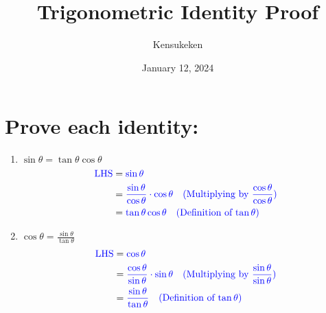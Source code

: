 \documentclass{article}
\title{Trigonometric Identity Proof}
\author{Kensukeken}
\date{January 12, 2024}
\begin{document}
\maketitle

\section{Prove each identity:}
\begin{multicols}{2}
    \begin{enumerate}[label=\alph*.]
        \item $\sin\theta = \tan \theta \cos \theta$
        \begin{align*}
          \text{\textcolor{blue}{LHS}} &= \text{\textcolor{blue}{$\sin\theta$}} \\
          &= \text{\textcolor{blue}{$\frac{\sin\theta}{\cos\theta} \cdot \cos\theta$}} \quad \text{\textcolor{blue}{(Multiplying by $\frac{\cos\theta}{\cos\theta}$)}} \\
          &= \text{\textcolor{blue}{$\tan\theta \cos\theta$}} \quad \text{\textcolor{blue}{(Definition of $\tan\theta$)}}
        \end{align*}
       

        \item $\cos \theta = \frac{\sin\theta}{\tan \theta}$
        \begin{align*}
          \text{\textcolor{blue}{LHS}} &= \text{\textcolor{blue}{$\cos\theta$}} \\
          &= \text{\textcolor{blue}{$\frac{\cos\theta}{\sin\theta} \cdot \sin\theta$}} \quad \text{\textcolor{blue}{(Multiplying by $\frac{\sin\theta}{\sin\theta}$)}} \\
          &= \text{\textcolor{blue}{$\frac{\sin\theta}{\tan\theta}$}} \quad \text{\textcolor{blue}{(Definition of $\tan\theta$)}}
        \end{align*}
    \end{enumerate}
\end{multicols}
\end{document}

